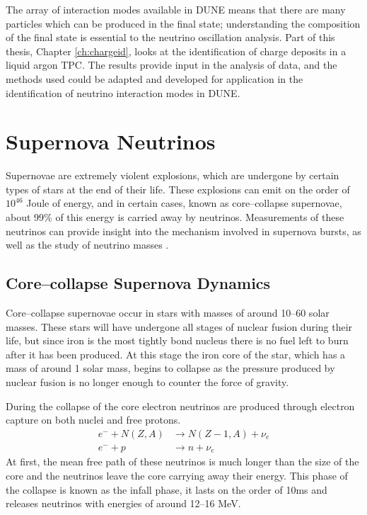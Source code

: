 {The array of interaction modes available in DUNE means that there are many
particles which can be produced in the final state; understanding 
the composition of the final state is essential to the neutrino oscillation 
analysis. Part of this thesis, Chapter \ref{ch:chargeid}, looks at
the identification of charge deposits in a liquid argon TPC. The results 
provide input in the analysis of \protodune{} data, and the methods used could 
be adapted and developed for application in the identification of neutrino 
interaction modes in DUNE. 

\section{Supernova Neutrinos} \label{nu_sn}

Supernovae are extremely violent explosions, which are undergone by certain 
types of stars at the end of their life. These explosions can emit on the 
order of $10^{46}$ Joule of energy, and in certain cases, known as 
core--collapse supernovae, about 99\% of this energy is carried away by 
neutrinos.  Measurements of these neutrinos can provide insight into the 
mechanism involved in supernova bursts, as well as the study of neutrino masses
\cite{GiuntiCarlo2007FoNP}.  

\subsection{Core--collapse Supernova Dynamics}

Core--collapse supernovae occur in stars with masses of around 10--60 solar 
masses. These stars will have undergone all stages of nuclear fusion during
their life, but since iron is the most tightly bond nucleus there is no fuel 
left to burn after it has been produced. At this stage the iron core of the
star, which has a mass of around 1 solar mass, begins to collapse as the
pressure produced by nuclear fusion is no longer enough to counter the force of
gravity. 

During the collapse of the core electron neutrinos are produced through
electron capture on both nuclei and free protons.
\begin{align}
	e^- + N(Z, A) &\rightarrow N(Z - 1, A) + \nu_e \\
	e^- + p &\rightarrow n + \nu_e
\end{align}
At first, the mean free path of these neutrinos is much longer than the size of
the core and the neutrinos leave the core carrying away their energy. This phase
of the collapse is known as the infall phase, it lasts on the order of 10ms and
releases neutrinos with energies of around 12--16 MeV.

}
